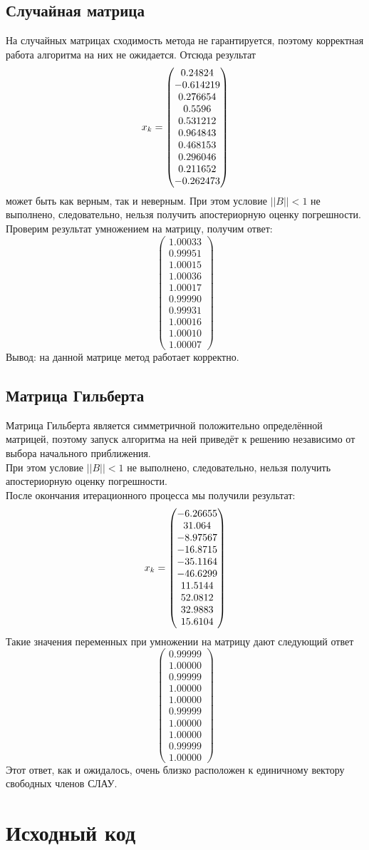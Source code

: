 \documentclass[../../report.tex]{subfiles}
\begin{document}
\subsection{Случайная матрица}
На случайных матрицах сходимость метода не гарантируется, 
поэтому корректная работа алгоритма на них не ожидается. Отсюда результат
\[
x_k = \begin{pmatrix} 0.24824 \\ -0.614219 \\ 0.276654 \\ 0.5596 \\ 0.531212 \\ 0.964843 \\ 0.468153 \\ 0.296046 \\ 0.211652 \\ -0.262473 \end{pmatrix}
\]
может быть как верным, так и неверным. При этом условие $||B|| < 1$ не выполнено, следовательно, нельзя получить апостериорную оценку погрешности. Проверим результат умножением на матрицу, получим ответ:
\[
\begin{pmatrix}
  1.00033 \\
  0.99951 \\
  1.00015 \\
  1.00036 \\
  1.00017 \\
  0.99990 \\
  0.99931 \\
  1.00016 \\
  1.00010 \\
  1.00007
\end{pmatrix}
\]
Вывод: на данной матрице метод работает корректно.

\subsection{Матрица Гильберта}
Матрица Гильберта является симметричной положительно определённой 
матрицей, поэтому запуск алгоритма на ней приведёт к решению 
независимо от выбора начального приближения. \\
При этом условие $||B|| < 1$ не выполнено, следовательно, нельзя получить апостериорную оценку погрешности. \\
После окончания итерационного процесса мы получили результат:
\[
x_k = \begin{pmatrix} -6.26655 \\ 31.064 \\ -8.97567 \\ -16.8715 \\ -35.1164 \\ -46.6299 \\ 11.5144 \\ 52.0812 \\ 32.9883 \\ 15.6104 \end{pmatrix}
\]
Такие значения переменных при умножении на матрицу дают следующий ответ
\[
\begin{pmatrix}
  0.99999 \\
  1.00000 \\
  0.99999 \\
  1.00000 \\
  1.00000 \\
  0.99999 \\
  1.00000 \\
  1.00000 \\
  0.99999 \\
  1.00000
\end{pmatrix}
\]
Этот ответ, как и ожидалось, очень близко расположен к единичному вектору свободных членов СЛАУ.

\section{Исходный код}
\end{document}
